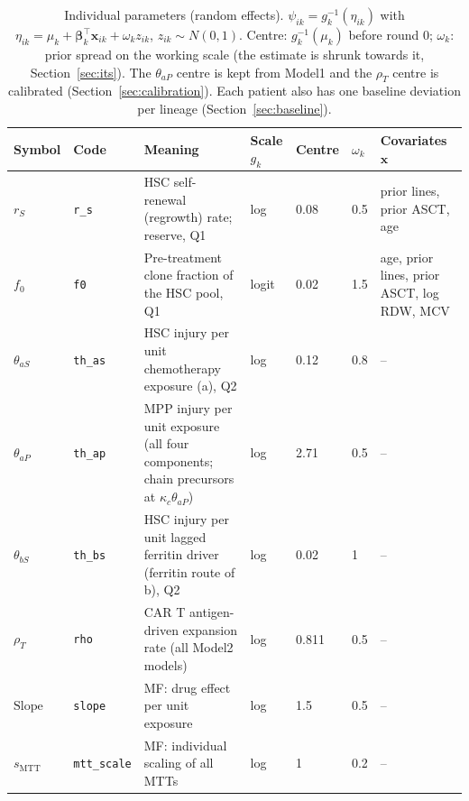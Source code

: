 \begin{table}[!htbp]
\centering
\footnotesize
\setlength{\tabcolsep}{3.5pt}
\caption{Individual parameters (random effects). $\psi_{ik}=g_k^{-1}(\eta_{ik})$ with $\eta_{ik}=\mu_k+\boldsymbol\beta_k^\top\mathbf{x}_{ik}+\omega_k z_{ik}$, $z_{ik}\sim N(0,1)$. Centre: $g_k^{-1}(\mu_k)$ before round 0; $\omega_k$: prior spread on the working scale (the estimate is shrunk towards it, Section~\ref{sec:its}). The $\theta_{aP}$ centre is kept from Model1 and the $\rho_T$ centre is calibrated (Section~\ref{sec:calibration}). Each patient also has one baseline deviation per lineage (Section~\ref{sec:baseline}).}
\label{tab:re}
\begin{tabular}{ll>{\raggedright\arraybackslash}p{5.4cm}lll>{\raggedright\arraybackslash}p{3.2cm}}
\toprule
Symbol & Code & Meaning & Scale $g_k$ & Centre & $\omega_k$ & Covariates $\mathbf{x}$ \\
\midrule
$r_S$ & \texttt{r\_s} & HSC self-renewal (regrowth) rate; reserve, Q1 & log & 0.08 & 0.5 & prior lines, prior ASCT, age \\
$f_0$ & \texttt{f0} & Pre-treatment clone fraction of the HSC pool, Q1 & logit & 0.02 & 1.5 & age, prior lines, prior ASCT, log RDW, MCV \\
$\theta_{aS}$ & \texttt{th\_as} & HSC injury per unit chemotherapy exposure (a), Q2 & log & 0.12 & 0.8 & -- \\
$\theta_{aP}$ & \texttt{th\_ap} & MPP injury per unit exposure (all four components; chain precursors at $\kappa_c\theta_{aP}$) & log & 2.71 & 0.5 & -- \\
$\theta_{bS}$ & \texttt{th\_bs} & HSC injury per unit lagged ferritin driver (ferritin route of b), Q2 & log & 0.02 & 1 & -- \\
$\rho_T$ & \texttt{rho} & CAR T antigen-driven expansion rate (all Model2 models) & log & 0.811 & 0.5 & -- \\
$\mathrm{Slope}$ & \texttt{slope} & MF: drug effect per unit exposure & log & 1.5 & 0.5 & -- \\
$s_{\mathrm{MTT}}$ & \texttt{mtt\_scale} & MF: individual scaling of all MTTs & log & 1 & 0.2 & -- \\
\bottomrule
\end{tabular}
\end{table}
